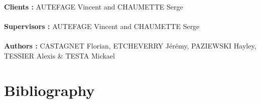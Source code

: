 \documentclass[12pt,a4paper]{report}
\begin{document}
\noindent
\begin{center}
\textbf{Clients :} AUTEFAGE Vincent and CHAUMETTE Serge\\~\\
\textbf{Supervisors :} AUTEFAGE Vincent and CHAUMETTE Serge\\~\\
\vspace{3cm}
\textbf{Authors :} CASTAGNET Florian, ETCHEVERRY Jérémy, PAZIEWSKI Hayley, TESSIER Alexis \& TESTA Mickael\\
\end{center}

\newpage

\thispagestyle{empty}
\setcounter{page}{0}

\setcounter{page}{0}

\tableofcontents

\newpage

\listoffigures

\newpage


\newpage


\newpage



\newpage



\newpage



\newpage



\newpage



\newpage



\newpage



\newpage



\newpage



\newpage



\newpage

\part{Bibliography}

\nocite{*}


\end{document}

